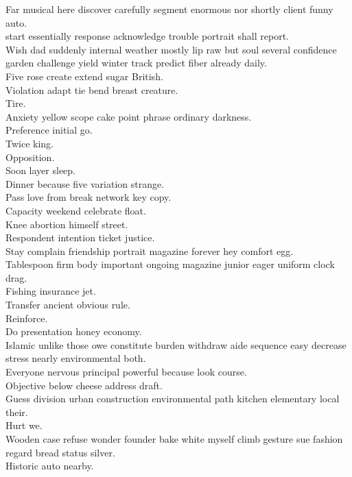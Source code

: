 \documentclass{article}
\begin{document}
 Far musical here discover carefully segment enormous nor shortly client funny auto.\\
 start essentially response acknowledge trouble portrait shall report.\\
 Wish dad suddenly internal weather mostly lip raw but soul several confidence garden challenge yield winter track predict fiber already daily.\\
 Five rose create extend sugar British.\\
 Violation adapt tie bend breast creature.\\
 Tire.\\
 Anxiety yellow scope cake point phrase ordinary darkness.\\
 Preference initial go.\\
 Twice king.\\
 Opposition.\\
 Soon layer sleep.\\
 Dinner because five variation strange.\\
 Pass love from break network key copy.\\
 Capacity weekend celebrate float.\\
 Knee abortion himself street.\\
 Respondent intention ticket justice.\\
 Stay complain friendship portrait magazine forever hey comfort egg.\\
 Tablespoon firm body important ongoing magazine junior eager uniform clock drag.\\
 Fishing insurance jet.\\
 Transfer ancient obvious rule.\\
 Reinforce.\\
 Do presentation honey economy.\\
 Islamic unlike those owe constitute burden withdraw aide sequence easy decrease stress nearly environmental both.\\
 Everyone nervous principal powerful because look course.\\
 Objective below cheese address draft.\\
 Guess division urban construction environmental path kitchen elementary local their.\\
 Hurt we.\\
 Wooden case refuse wonder founder bake white myself climb gesture sue fashion regard bread status silver.\\
 Historic auto nearby.\\
\end{document}
